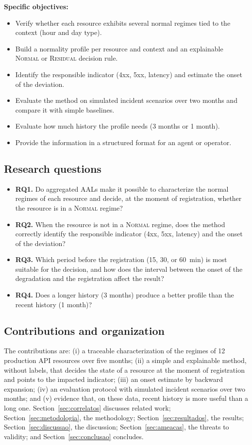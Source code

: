 \documentclass[sigconf,nonacm]{acmart}
\newcommand{\Normal}{\textsc{Normal}\xspace}
\newcommand{\Residual}{\textsc{Residual}\xspace}
\begin{document}
\textbf{Specific objectives:}
\begin{itemize}
  \item Verify whether each resource exhibits several normal regimes tied to the context (hour and day type).
  \item Build a normality profile per resource and context and an explainable \Normal or \Residual decision rule.
  \item Identify the responsible indicator (4xx, 5xx, latency) and estimate the onset of the deviation.
  \item Evaluate the method on simulated incident scenarios over two months and compare it with simple baselines.
  \item Evaluate how much history the profile needs (3 months or 1 month).
  \item Provide the information in a structured format for an agent or operator.
\end{itemize}

\subsection{Research questions}
\begin{itemize}
  \item \textbf{RQ1.} Do aggregated AALs make it possible to characterize the normal regimes of each resource and decide, at the moment of registration, whether the resource is in a \Normal regime?
  \item \textbf{RQ2.} When the resource is not in a \Normal regime, does the method correctly identify the responsible indicator (4xx, 5xx, latency) and the onset of the deviation?
  \item \textbf{RQ3.} Which period before the registration (15, 30, or 60~min) is most suitable for the decision, and how does the interval between the onset of the degradation and the registration affect the result?
  \item \textbf{RQ4.} Does a longer history (3 months) produce a better profile than the recent history (1 month)?
\end{itemize}

\subsection{Contributions and organization}
The contributions are: (i) a traceable characterization of the regimes of 12 production API resources over five months; (ii) a simple and explainable method, without labels, that decides the state of a resource at the moment of registration and points to the impacted indicator; (iii) an onset estimate by backward expansion; (iv) an evaluation protocol with simulated incident scenarios over two months; and (v) evidence that, on these data, recent history is more useful than a long one. Section~\ref{sec:correlatos} discusses related work; Section~\ref{sec:metodologia}, the methodology; Section~\ref{sec:resultados}, the results; Section~\ref{sec:discussao}, the discussion; Section~\ref{sec:ameacas}, the threats to validity; and Section~\ref{sec:conclusao} concludes.
\end{document}
